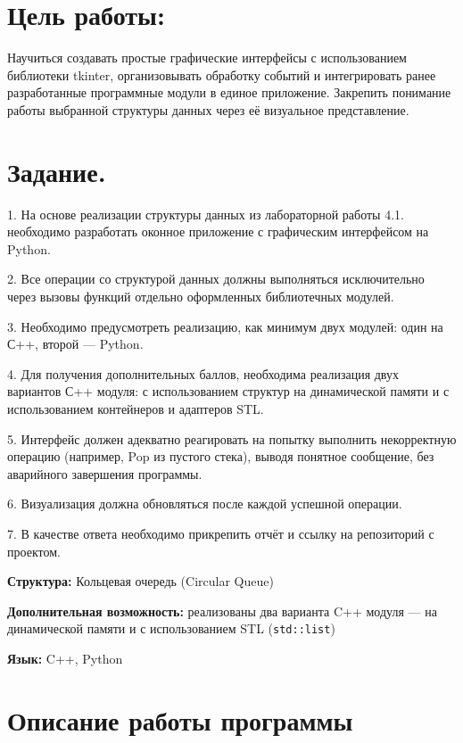 \documentclass[oneside,a4paper,14pt]{extarticle}
\begin{document}
\begin{flushleft}
\section*{Цель работы:}
\noindent Научиться создавать простые графические интерфейсы с использованием библиотеки tkinter, организовывать обработку событий и интегрировать ранее разработанные программные модули в единое приложение. Закрепить понимание работы выбранной структуры данных через её визуальное представление.

\section*{Задание.}

1. На основе реализации структуры данных из лабораторной работы 4.1. необходимо разработать оконное приложение с графическим интерфейсом на Python.

2. Все операции со структурой данных должны выполняться исключительно через вызовы функций отдельно оформленных библиотечных модулей.

3. Необходимо предусмотреть реализацию, как минимум двух модулей: один на С++, второй --- Python.

4. Для получения дополнительных баллов, необходима реализация двух вариантов С++ модуля: с использованием структур на динамической памяти и с использованием контейнеров и адаптеров STL.

5. Интерфейс должен адекватно реагировать на попытку выполнить некорректную операцию (например, Pop из пустого стека), выводя понятное сообщение, без аварийного завершения программы.

6. Визуализация должна обновляться после каждой успешной операции.

7. В качестве ответа необходимо прикрепить отчёт и ссылку на репозиторий с проектом.

\textbf{Структура:} Кольцевая очередь (Circular Queue)

\textbf{Дополнительная возможность:} реализованы два варианта C++ модуля --- на динамической памяти и с использованием STL (\texttt{std::list})

\textbf{Язык:} C++, Python
\end{flushleft}

\newpage
\section*{Описание работы программы}
\end{document}
